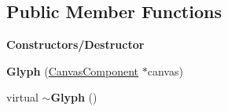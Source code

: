 \subsection*{Public Member Functions}
\begin{Indent}\textbf{ Constructors/\+Destructor}\par
\begin{DoxyCompactItemize}
\item 
\mbox{\label{classrev_1_1_glyph_aeb0a19af1b570247e155195d75b39f81}} 
{\bfseries Glyph} (\mbox{\hyperlink{classrev_1_1_canvas_component}{Canvas\+Component}} $\ast$canvas)
\item 
\mbox{\label{classrev_1_1_glyph_a127328037003a238cdc4b31f9d3a665f}} 
virtual {\bfseries $\sim$\+Glyph} ()
\end{DoxyCompactItemize}
\end{Indent}
